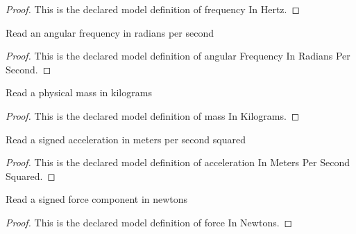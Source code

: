 \begin{proof}
  This is the declared model definition of frequency In Hertz.
\end{proof}
\begin{definition}
  \label{def:physics:phyx-mini-0205:phyxminiproblems-problemphyxmini0205-angularfrequencyinradianspersecond}
  Read an angular frequency in radians per second
\end{definition}
\begin{proof}
  This is the declared model definition of angular Frequency In Radians Per Second.
\end{proof}
\begin{definition}
  \label{def:physics:phyx-mini-0205:phyxminiproblems-problemphyxmini0205-massinkilograms}
  Read a physical mass in kilograms
\end{definition}
\begin{proof}
  This is the declared model definition of mass In Kilograms.
\end{proof}
\begin{definition}
  \label{def:physics:phyx-mini-0205:phyxminiproblems-problemphyxmini0205-accelerationinmeterspersecondsquared}
  Read a signed acceleration in meters per second squared
\end{definition}
\begin{proof}
  This is the declared model definition of acceleration In Meters Per Second Squared.
\end{proof}
\begin{definition}
  \label{def:physics:phyx-mini-0205:phyxminiproblems-problemphyxmini0205-forceinnewtons}
  Read a signed force component in newtons
\end{definition}
\begin{proof}
  This is the declared model definition of force In Newtons.
\end{proof}
